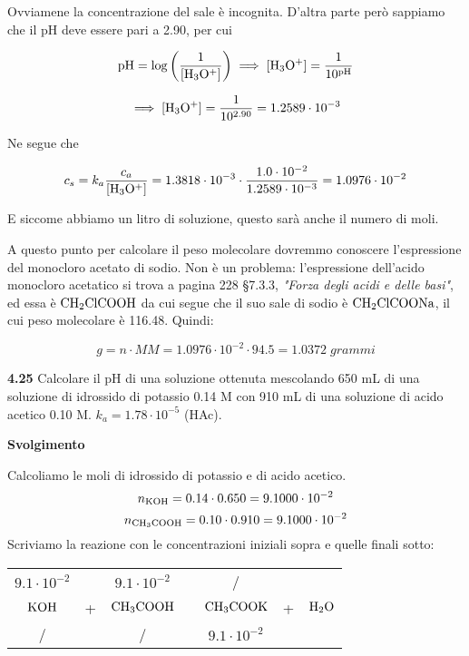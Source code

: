Ovviamene la concentrazione del sale è incognita. D'altra parte però sappiamo che il pH deve essere pari a 2.90, per cui 

$$\rm pH=\log{\left(\frac{1}{[H_3O^+]}\right)}
\implies
[H_3O^+]=\frac{1}{10^{pH}}$$

$$\implies
\rm [H_3O^+]=\frac{1}{10^{2.90}}
=1.2589 \cdot 10^{-3}$$

Ne segue che

$$c_s=k_a\frac{c_a}{\rm [H_3O^+]}
=1.3818 \cdot 10^{-3} \cdot \frac{1.0 \cdot 10^{-2}}{1.2589 \cdot 10^{-3}}
=1.0976 \cdot 10^{-2}$$

E siccome abbiamo un litro di soluzione, questo sarà anche il numero di moli.

A questo punto per calcolare il peso molecolare dovremmo conoscere l'espressione del monocloro acetato di sodio. Non è un problema: l'espressione dell'acido monocloro acetatico si trova a pagina 228 §7.3.3, \textit{"Forza degli acidi e delle basi"}, ed essa è $\rm CH_2ClCOOH$ da cui segue che il suo sale di sodio è $\rm CH_2ClCOONa$, il cui peso molecolare è 116.48. Quindi:

$$g=n \cdot MM=1.0976 \cdot 10^{-2} \cdot 94.5=1.0372\;grammi$$

\vspace{0.2cm}\textbf{4.25} Calcolare il pH di una soluzione ottenuta mescolando 650 mL di una soluzione di idrossido di potassio 0.14 M con 910 mL di una soluzione di acido acetico 0.10 M. $k_a = 1.78 \cdot 10^{-5}$ (HAc).

\vspace{0.2cm}\large\textbf{Svolgimento}\normalsize

\vspace{0.2cm}Calcoliamo le moli di idrossido di potassio e di acido acetico.
$$n_{\rm KOH}=0.14\cdot 0.650 = 9.1000\cdot 10^{-2}$$
$$n_{\rm CH_3COOH}=0.10\cdot 0.910 = 9.1000\cdot 10^{-2}$$
Scriviamo la reazione con le concentrazioni iniziali sopra e quelle finali sotto:

\begin{center}
    \begin{tabular}{ccccccc}
        $9.1\cdot 10^{-2}$ &  & $9.1\cdot 10^{-2}$ & & / &&\\
        $\rm KOH$ & + & $\rm CH_3COOH$ & \ce{->} & $\rm CH_3COOK$ & + & $\rm H_2O$\\
        / &  &  / & & $9.1\cdot 10^{-2}$ &&\\
    \end{tabular}
\end{center}

